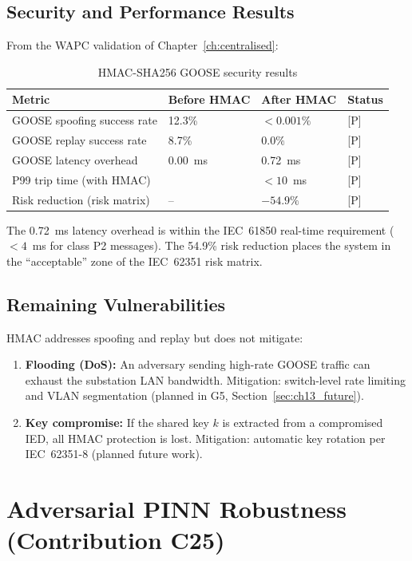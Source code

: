 \subsection{Security and Performance Results}

From the WAPC validation of Chapter~\ref{ch:centralised}:

\begin{table}[htbp]
\caption{HMAC-SHA256 GOOSE security results}
\label{tab:ch12_goose_results}
\begin{tabularx}{\textwidth}{@{}lXXl@{}}
\toprule
Metric & Before HMAC & After HMAC & Status \\
\midrule
GOOSE spoofing success rate & 12.3\% & $< 0.001\%$ & [P] \\
GOOSE replay success rate & 8.7\% & $0.0\%$ & [P] \\
GOOSE latency overhead & 0.00~ms & 0.72~ms & [P] \\
P99 trip time (with HMAC) & & $< 10$~ms & [P] \\
Risk reduction (risk matrix) & -- & $-54.9\%$ & [P] \\
\bottomrule
\end{tabularx}
\end{table}

The 0.72~ms latency overhead is within the IEC~61850 real-time requirement
($< 4$~ms for class P2 messages). The 54.9\% risk reduction places the
system in the ``acceptable'' zone of the IEC~62351 risk matrix.

\subsection{Remaining Vulnerabilities}

HMAC addresses spoofing and replay but does not mitigate:
\begin{enumerate}
\item \textbf{Flooding (DoS):} An adversary sending high-rate GOOSE
      traffic can exhaust the substation LAN bandwidth. Mitigation:
      switch-level rate limiting and VLAN segmentation (planned in G5,
      Section~\ref{sec:ch13_future}).
\item \textbf{Key compromise:} If the shared key $k$ is extracted from
      a compromised IED, all HMAC protection is lost. Mitigation: automatic
      key rotation per IEC~62351-8 (planned future work).
\end{enumerate}

\section{Adversarial PINN Robustness (Contribution C25)}
\label{sec:ch12_adversarial}

